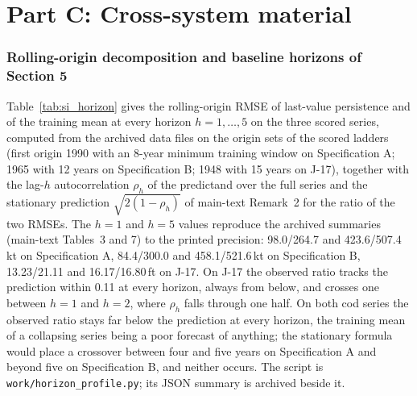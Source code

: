 \FloatBarrier
\part*{Part C: Cross-system material}

\section{Rolling-origin decomposition and baseline horizons of Section 5}\label{si:horizon}

Table~\ref{tab:si_horizon} gives the rolling-origin RMSE of last-value persistence and of the training mean at every horizon $h=1,\dots,5$ on the three scored series, computed from the archived data files on the origin sets of the scored ladders (first origin 1990 with an 8-year minimum training window on Specification A; 1965 with 12 years on Specification B; 1948 with 15 years on J-17), together with the lag-$h$ autocorrelation $\rho_h$ of the predictand over the full series and the stationary prediction $\sqrt{2(1-\rho_h)}$ of main-text Remark~2 for the ratio of the two RMSEs. The $h=1$ and $h=5$ values reproduce the archived summaries (main-text Tables~3 and 7) to the printed precision: 98.0/264.7 and 423.6/507.4\,kt on Specification A, 84.4/300.0 and 458.1/521.6\,kt on Specification B, 13.23/21.11 and 16.17/16.80\,ft on J-17. On J-17 the observed ratio tracks the prediction within 0.11 at every horizon, always from below, and crosses one between $h=1$ and $h=2$, where $\rho_h$ falls through one half. On both cod series the observed ratio stays far below the prediction at every horizon, the training mean of a collapsing series being a poor forecast of anything; the stationary formula would place a crossover between four and five years on Specification A and beyond five on Specification B, and neither occurs. The script is \texttt{work/horizon\_profile.py}; its JSON summary is archived beside it.

\begin{table}[!htb]
\centering\small
\caption{Horizon profile of the two baselines on the scored origin sets. RMSE in kt (cod) and ft (J-17); ratio $=$ RMSE(persistence)/RMSE(training mean); $\rho_h$ is the lag-$h$ autocorrelation of the predictand over the full series.}
\label{tab:si_horizon}

\end{table}

